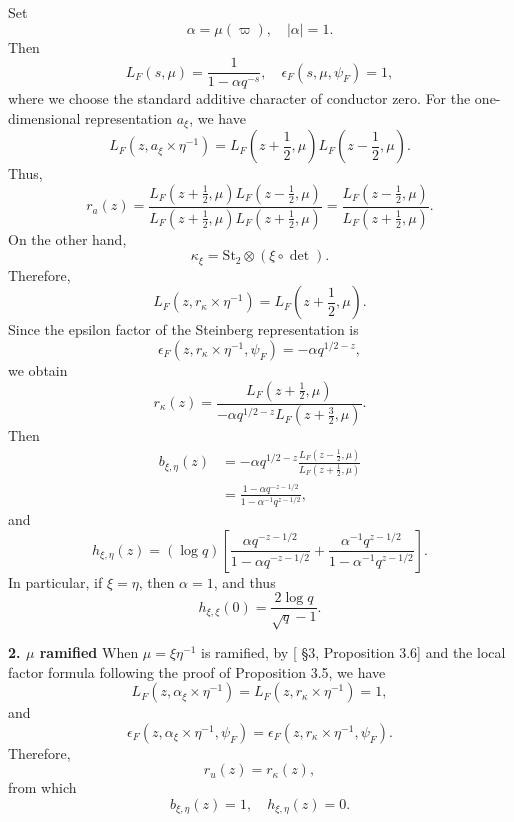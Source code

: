 \documentclass[11pt]{amsart}
\theoremstyle{definition}
\numberwithin{equation}{section}
\begin{document}
	Set
	\[
	\alpha = \mu(\varpi), \quad |\alpha| = 1.
	\]
	Then
	\[
	L_F(s, \mu) = \frac{1}{1 - \alpha q^{-s}}, \quad \epsilon_F(s, \mu, \psi_F) = 1,
	\]
	where we choose the standard additive character of conductor zero. For the one-dimensional representation \(a_\xi\), we have
	\[
	L_F(z, a_\xi \times \eta^{-1}) = L_F\left(z + \frac{1}{2}, \mu\right) L_F\left(z - \frac{1}{2}, \mu\right).
	\]
	Thus,
	\[
	r_a(z) = \frac{L_F\left(z + \frac{1}{2}, \mu\right) L_F\left(z - \frac{1}{2}, \mu\right)}{L_F\left(z + \frac{1}{2}, \mu\right) L_F\left(z + \frac{1}{2}, \mu\right)} = \frac{L_F\left(z - \frac{1}{2}, \mu\right)}{L_F\left(z + \frac{1}{2}, \mu\right)}.
	\]
	On the other hand,
	\[
	\kappa_\xi = \mathrm{St}_2 \otimes (\xi \circ \det).
	\]
	Therefore,
	\[
	L_F(z, r_\kappa \times \eta^{-1}) = L_F\left(z + \frac{1}{2}, \mu\right).
	\]
	Since the epsilon factor of the Steinberg representation is
	\[
	\epsilon_F(z, r_\kappa \times \eta^{-1}, \psi_F) = -\alpha q^{1/2 - z},
	\]
	we obtain
	\[
	r_\kappa(z) = \frac{L_F\left(z + \frac{1}{2}, \mu\right)}{-\alpha q^{1/2 - z} L_F\left(z + \frac{3}{2}, \mu\right)}.
	\]
	Then
	\begin{equation}
		\begin{aligned}
			b_{\xi, \eta}(z) &= -\alpha q^{1/2 - z} \frac{L_F\left(z - \frac{1}{2}, \mu\right)}{L_F\left(z + \frac{1}{2}, \mu\right)} \\
			&= \frac{1 - \alpha q^{-z-1/2}}{1 - \alpha^{-1} q^{z-1/2}},
		\end{aligned}
	\end{equation}and
	\begin{equation}
		h_{\xi, \eta}(z) = (\log q) \left[ \frac{\alpha q^{-z-1/2}}{1 - \alpha q^{-z-1/2}} + \frac{\alpha^{-1} q^{z-1/2}}{1 - \alpha^{-1} q^{z-1/2}} \right].
	\end{equation}
	In particular, if \(\xi = \eta\), then \(\alpha = 1\), and thus
	\[
	h_{\xi, \xi}(0) = \frac{2 \log q}{\sqrt{q} - 1}.
	\]
	
	\textbf{2. \(\mu\) ramified}
	When
	\(\mu = \xi \eta^{-1}\)
	is ramified, by [ \cite{JL70} \S3, Proposition 3.6] and the local factor formula following the proof of Proposition 3.5, we have
	\[
	L_F(z, \alpha_\xi \times \eta^{-1}) = L_F(z, r_\kappa \times \eta^{-1}) = 1,
	\]and
	\[
	\epsilon_F(z, \alpha_\xi \times \eta^{-1}, \psi_F) = \epsilon_F(z, r_\kappa \times \eta^{-1}, \psi_F).
	\]
	Therefore,
	\[
	r_u(z) = r_\kappa(z),
	\]
	from which
	\begin{equation}
		b_{\xi, \eta}(z) = 1, \quad h_{\xi, \eta}(z) = 0.
	\end{equation}
	
\end{document}
